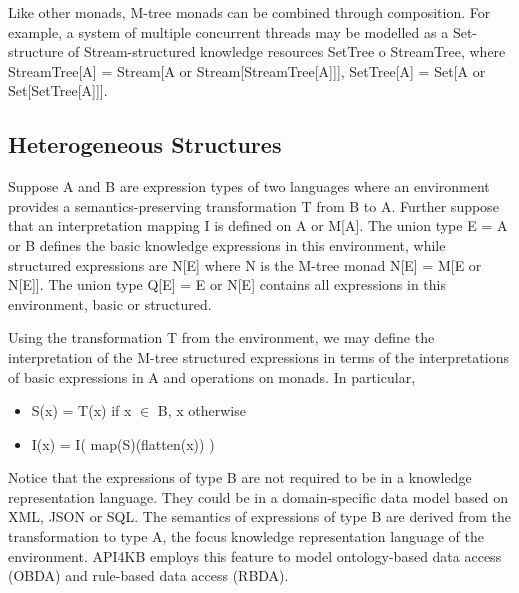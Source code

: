\documentclass[runningheads]{llncs}
\begin{document}
Like other monads, M-tree monads can be combined through composition.
For example, a system of multiple concurrent threads may be modelled as a Set-structure of Stream-structured knowledge resources SetTree o StreamTree, where StreamTree[A] = Stream[A or Stream[StreamTree[A]]], SetTree[A] = Set[A or Set[SetTree[A]]].


\subsection{Heterogeneous Structures}
Suppose A and B are expression types of two languages where an environment provides a semantics-preserving transformation T from B to A.
Further suppose that an interpretation mapping I is defined on A or M[A].
The union type E = A or B defines the basic knowledge expressions in this environment, while structured expressions are N[E] where N is the M-tree monad  N[E] = M[E or N[E]].
The union type Q[E] = E or N[E] contains all expressions in this environment, basic or structured. 

Using the transformation T from the environment, we may define the interpretation of the M-tree structured expressions in terms of the interpretations of basic expressions in A and operations on monads. In particular,
\begin{itemize}
\item S(x) = T(x) if x $\in$ B, x otherwise
\item I(x) = I( map(S)(flatten(x)) )
\end{itemize}
Notice that the expressions of type B are not required to be in a knowledge representation language. They could be in a domain-specific data model based on XML, JSON or SQL. The semantics of expressions of type B are derived from the transformation to type A, the focus  knowledge representation language of the environment. API4KB employs this feature to model ontology-based data access (OBDA) and rule-based data access (RBDA).
\end{document}
